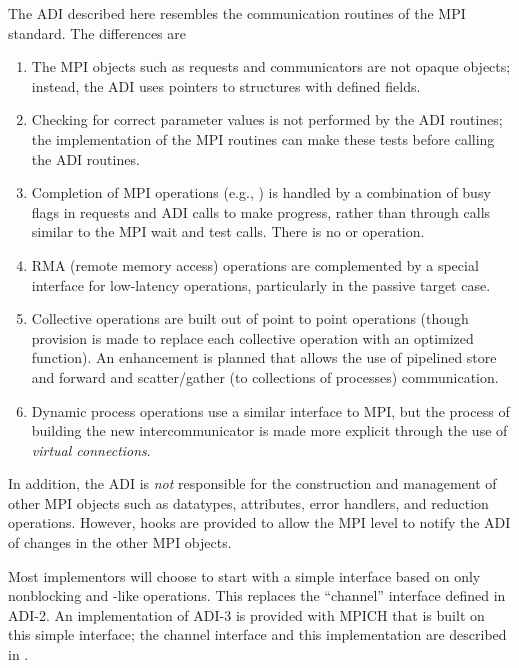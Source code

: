 The ADI described here resembles the communication routines of the MPI
standard.  The differences are
\begin{enumerate}
\item The MPI objects such as requests and communicators are not
opaque objects; instead, the ADI uses pointers to structures with
defined fields.

\item Checking for correct parameter values is not performed by the
ADI routines; the implementation of the MPI routines can make these
tests before calling the ADI routines.

\item Completion of MPI operations (e.g., ) is handled
by a combination of busy flags in requests and ADI calls to make
progress, rather than through calls similar to the MPI wait and test
calls.  There is no  or  operation.

\item RMA (remote memory access) operations are complemented by a
special interface for low-latency operations, particularly in the
passive target case.

\item Collective operations are built out of point to point operations
(though provision is made to replace each collective operation with an
optimized function).  An enhancement is planned that allows the use of
pipelined store and forward and scatter/gather (to collections of processes)
communication.  

\item Dynamic process operations use a similar interface to MPI, but the
process of building the new intercommunicator is made more explicit
through the use of \emph{virtual connections}.
\end{enumerate}

In addition, the ADI is \emph{not} responsible for the construction
and management of other MPI objects such as datatypes, attributes,
error handlers, and reduction operations.  However, hooks are provided to
allow the MPI level to notify the ADI of changes in the other MPI objects.

Most implementors will choose to start with a simple interface based
on only nonblocking  and 
-like operations.  This replaces
the ``channel'' interface defined in ADI-2.  An implementation of
ADI-3 is provided with MPICH that is built on this simple
interface; the channel interface and this implementation are described
in \cite{channel3-tcp}.

